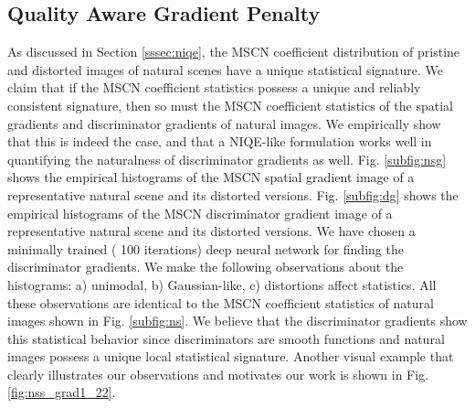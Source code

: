 \documentclass{article}
\begin{document}
\subsection{Quality Aware Gradient Penalty}\label{ssec:qagp}
As discussed in Section \ref{sssec:niqe}, the MSCN coefficient distribution of pristine and distorted images of natural scenes have a unique statistical signature. We claim that if the MSCN coefficient statistics possess a unique and reliably consistent signature, then so must the MSCN coefficient statistics of the spatial gradients and discriminator gradients of natural images. We empirically show that this is indeed the case, and that a NIQE-like formulation works well in quantifying the naturalness of discriminator gradients as well.
Fig. \ref{subfig:nsg} shows the empirical histograms of the MSCN spatial gradient image of a representative natural scene and its distorted versions. Fig. \ref{subfig:dg} shows the empirical 
histograms of the MSCN discriminator gradient image of a representative natural scene and its distorted versions. We have chosen a minimally trained ( 100 iterations) deep neural network for finding the discriminator gradients.
We make the following observations about the histograms: a) unimodal, b) Gaussian-like, c) distortions affect statistics. All these observations are identical to the MSCN coefficient statistics of natural images shown in Fig. \ref{subfig:ns}. We believe that the discriminator gradients show this statistical behavior since discriminators are smooth functions and natural images possess a unique local statistical signature. Another visual example that clearly illustrates our observations and motivates our work is shown in Fig. \ref{fig:nss_grad1_22}. 
\end{document}
